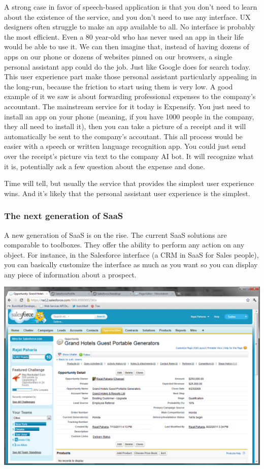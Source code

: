 \documentclass[12pt]{article}
\begin{document}
A strong case in favor of speech-based application is that you don't need to
learn about the existence of the service, and you don't need to use any
interface. UX designers often struggle to make an app available to all. No
interface is probably the most efficient. Even a 80 year-old who has never used
an app in their life would be able to use it. We can then imagine that, instead
of having dozens of apps on our phone or dozens of websites pinned on our
browsers, a single personal assistant app could do the job. Just like Google
does for search today. This user experience part make those personal assistant
particularly appealing in the long-run, because the friction to start using them
is very low. A good example of it we saw is about forwarding professional
expenses to the company's accountant. The mainstream service for it today is
Expensify. You just need to install an app on your phone (meaning, if you have
1000 people in the company, they all need to install it), then you can take a
picture of a receipt and it will automatically be sent to the company's
accoutant. This all process would be easier with a speech or written language
recognition app. You could just send over the receipt's picture via text to the
company AI bot. It will recognize what it is, potentially ask a few question
about the expense and done.

Time will tell, but usually the service that provides the simplest user
experience wins. And it's likely that the personal assistant user experience is
the simplest.


\subsubsection{The next generation of SaaS}

A new generation of SaaS is on the rise. The current SaaS solutions are comparable to toolboxes. They offer the ability to perform any action on any object. For instance, in the Salesforce interface (a CRM in SaaS for Sales people), you can basically customize the interface as much as you want so you can display any piece of information about a prospect.


\smallskip
\includegraphics[width=\textwidth]{salesforce}
\smallskip
\end{document}
